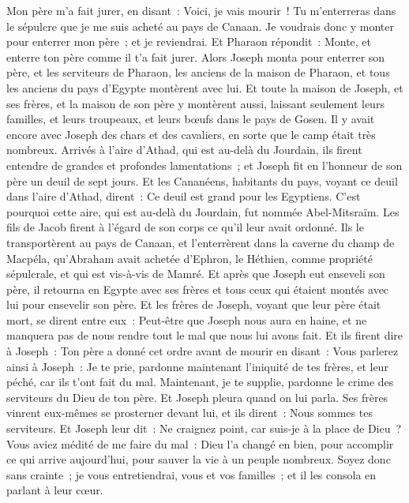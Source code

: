 \begin{multicols}{2}
Mon père m'a fait jurer, en disant~: Voici, je vais mourir~! Tu m'enterreras dans le sépulcre que je me suis acheté au pays de Canaan. Je voudrais donc y monter pour enterrer mon père~; et je reviendrai.
Et Pharaon répondit~: Monte, et enterre ton père comme il t'a fait jurer.
Alors Joseph monta pour enterrer son père, et les serviteurs de Pharaon, les anciens de la maison de Pharaon, et tous les anciens du pays d'Egypte montèrent avec lui.
Et toute la maison de Joseph, et ses frères, et la maison de son père y montèrent aussi, laissant seulement leurs familles, et leurs troupeaux, et leurs bœufs dans le pays de Gosen.
Il y avait encore avec Joseph des chars et des cavaliers, en sorte que le camp était très nombreux.
Arrivés à l'aire d'Athad, qui est au-delà du Jourdain, ils firent entendre de grandes et profondes lamentations~; et Joseph fit en l'honneur de son père un deuil de sept jours.
Et les Cananéens, habitants du pays, voyant ce deuil dans l'aire d'Athad, dirent~: Ce deuil est grand pour les Egyptiens. C'est pourquoi cette aire, qui est au-delà du Jourdain, fut nommée Abel-Mitsraïm.
Les fils de Jacob firent à l'égard de son corps ce qu'il leur avait ordonné.
Ils le transportèrent au pays de Canaan, et l'enterrèrent dans la caverne du champ de Macpéla, qu'Abraham avait achetée d'Ephron, le Héthien, comme propriété sépulcrale, et qui est vis-à-vis de Mamré.
Et après que Joseph eut enseveli son père, il retourna en Egypte avec ses frères et tous ceux qui étaient montés avec lui pour ensevelir son père.
Et les frères de Joseph, voyant que leur père était mort, se dirent entre eux~: Peut-être que Joseph nous aura en haine, et ne manquera pas de nous rendre tout le mal que nous lui avons fait.
Et ils firent dire à Joseph~: Ton père a donné cet ordre avant de mourir en disant~:
Vous parlerez ainsi à Joseph~: Je te prie, pardonne maintenant l'iniquité de tes frères, et leur péché, car ils t'ont fait du mal. Maintenant, je te supplie, pardonne le crime des serviteurs du Dieu de ton père. Et Joseph pleura quand on lui parla.
Ses frères vinrent eux-mêmes se prosterner devant lui, et ils dirent~: Nous sommes tes serviteurs.
Et Joseph leur dit~: Ne craignez point, car suis-je à la place de Dieu~?
Vous aviez médité de me faire du mal~: Dieu l'a changé en bien, pour accomplir ce qui arrive aujourd'hui, pour sauver la vie à un peuple nombreux.
Soyez donc sans crainte~; je vous entretiendrai, vous et vos familles~; et il les consola en parlant à leur cœur.

\end{multicols}
